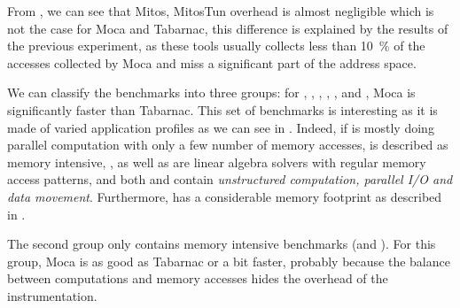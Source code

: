 From , we can see that \gls{Mitos}, MitosTun overhead is
almost negligible which is not the case for \gls{Moca} and \gls{Tabarnac}, this
difference is explained by the results of the previous experiment, as these
tools usually collects less than \SI{10}{\%} of the accesses collected by \gls{Moca} and
miss a significant part of the address space.

We can classify the benchmarks into three groups:
for \BT, \CG, \DC,  \EP, \LU, \SP and \UA, \gls{Moca} is
significantly faster than \gls{Tabarnac}. This set of benchmarks is interesting as
it is made of varied application profiles as we can see in .
Indeed, if \EP is mostly doing parallel computation with only a few number of
memory accesses, \CG is described as memory intensive,
\BT, \LU as well as \SP are linear algebra solvers with regular memory access patterns,
and both \UA and \DC contain \emph{unstructured computation,
parallel I/O and data movement}. Furthermore, \DC has a considerable memory footprint as
described in .

The second group only contains memory intensive benchmarks (\FT and
\IS). For this group, \gls{Moca} is as good as \gls{Tabarnac} or a bit faster, probably
because the balance between computations and memory accesses hides the
overhead of the instrumentation.

